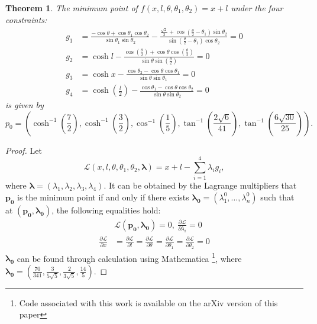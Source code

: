 \documentclass[11pt,reqno]{amsart}
\theoremstyle{plain}
\newtheorem{theorem}{Theorem}[section]
\theoremstyle{definition}
\theoremstyle{remark}
\numberwithin{equation}{section}
\numberwithin{figure}{section}
\begin{document}
\begin{theorem} \label{thm 3.3}
        The minimum point of $f(x,l,\theta,\theta_1,\theta_2)=x+l$ under the four constraints: 
        \begin{equation}
            \begin{aligned}
            g_1&=\frac{-\cos \theta+\cos \theta_1 \cos \theta_2}{\sin \theta_1 \sin \theta_2}-\frac{\frac{\sqrt{2}}{2}+\cos(\frac{\theta}{2}-\theta_1)\sin \theta_2}{\sin(\frac{\theta}{2}-\theta_1)\cos \theta_2}=0\\
                g_2&=\cosh{l} - \frac{\cos\left(\frac{\theta}{2}\right)+\cos\theta \cos\left(\frac{\theta}{2}\right)}{\sin\theta\sin\left(\frac{\theta}{2}\right)}=0\\
                g_3&=\cosh x-\frac{\cos \theta_2-\cos \theta\cos \theta_1}{\sin \theta\sin \theta_1}=0\\
    g_4&=\cosh(\frac{l}{2})-\frac{\cos \theta_1-\cos \theta\cos \theta_2}{\sin \theta \sin \theta_2}=0
            \end{aligned}
        \end{equation}
        is given by
        $$ p_0=\left(\cosh^{-1}\left(\frac{7}{2}\right),\cosh^{-1}\left(\frac{3}{2}\right),\cos^{-1}\left(\frac{1}{5}\right),\tan^{-1}\left(\frac{2\sqrt{6}}{41}\right),\tan^{-1}\left(\frac{6\sqrt{30}}{25}\right)\right).$$
\end{theorem}
\begin{proof}
    Let 
    \begin{equation*}
        \mathcal{L}(x,l,\theta,\theta_1,\theta_2,\boldsymbol{\lambda})=x+l-\sum_{i=1}^4\lambda_ig_i,
    \end{equation*}
     where $\boldsymbol{\lambda}=(\lambda_1,\lambda_2,\lambda_3,\lambda_4)$.
It can be obtained by the Lagrange multipliers that $\boldsymbol{p_0}$ is the minimum point if and only if there exists $\boldsymbol{\lambda_0}=(\lambda_1^0,\ldots,\lambda_n^0)$ such that at $(\boldsymbol{p_0},\boldsymbol{\lambda_0})$, the following equalities hold:
\begin{equation*}
    \begin{aligned}
    &\mathcal{L}(\boldsymbol{p_0},\boldsymbol{\lambda_0})=0,~\frac{\partial \mathcal{L}}{\partial \lambda_i}=0\\
        \frac{\partial \mathcal{L}}{\partial x}&=\frac{\partial \mathcal{L}}{\partial l}=\frac{\partial \mathcal{L}}{\partial \theta}=\frac{\partial \mathcal{L}}{\partial \theta_1}=\frac{\partial \mathcal{L}}{\partial \theta_2}=0
    \end{aligned}
\end{equation*}
$\boldsymbol{\lambda_0}$ can be found through calculation using Mathematica \footnote{Code associated with this work is available on the arXiv version of this paper}, where $\boldsymbol{\lambda_0} =(\frac{70}{341},\frac{3}{5 \sqrt{5}},\frac{2}{3 \sqrt{5}},\frac{14}{5})$.
\end{proof}
\end{document}
